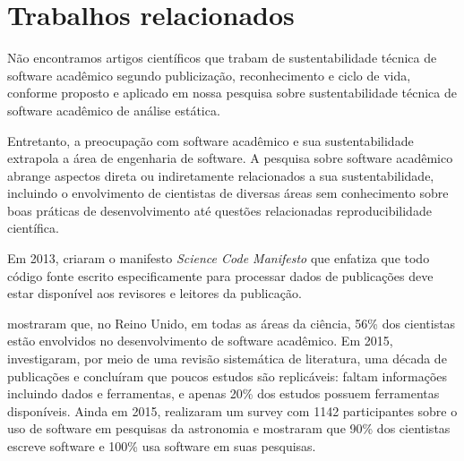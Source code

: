 

\section{Trabalhos relacionados}
\label{sec:trabalhosrelacionados}


Não encontramos artigos científicos que trabam de sustentabilidade técnica
de software acadêmico segundo publicização, reconhecimento e ciclo de vida,
conforme proposto e aplicado em nossa pesquisa sobre sustentabilidade
técnica de software acadêmico de análise estática.

Entretanto, a preocupação com software acadêmico e sua sustentabilidade
extrapola a área de engenharia de software.
A pesquisa sobre software acadêmico abrange aspectos 
direta ou indiretamente relacionados a sua sustentabilidade,
incluindo o envolvimento de cientistas de diversas áreas sem conhecimento
sobre boas práticas de desenvolvimento até 
questões relacionadas reproducibilidade científica.

Em 2013, 
criaram o manifesto {\it Science Code Manifesto} que enfatiza que todo código fonte
escrito especificamente para processar dados de publicações deve estar
disponível aos revisores e leitores da publicação.

 mostraram que, no Reino Unido, em todas as áreas da
ciência, 56\% dos cientistas estão envolvidos no desenvolvimento de software
acadêmico. 
Em 2015, 
investigaram, por meio de uma revisão sistemática de literatura, uma década de
publicações e concluíram que poucos estudos são replicáveis:
faltam informações incluindo dados e ferramentas, e apenas 20\% dos estudos
possuem ferramentas disponíveis.
Ainda em 2015,  realizaram
um survey com 1142 participantes sobre o uso de software em pesquisas da
astronomia e mostraram que 90\% dos cientistas escreve software e 100\% usa
software em suas pesquisas.

